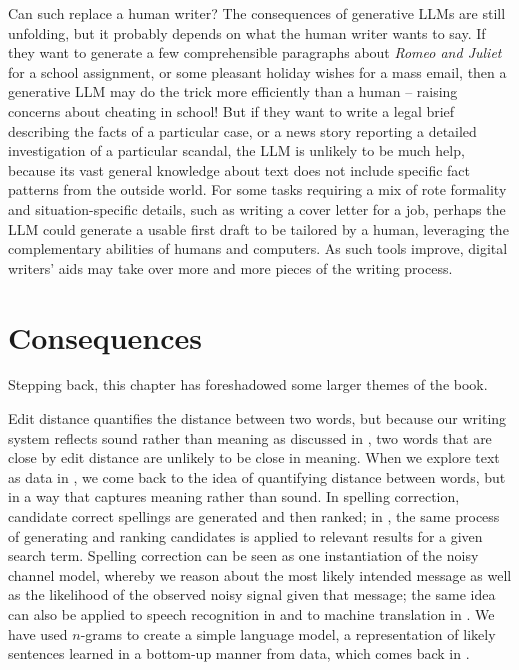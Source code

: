 Can such  replace a human writer?  The consequences of generative LLMs are still unfolding, but it probably depends on what the human writer wants to say.  If they want to generate a few comprehensible paragraphs about \textit{Romeo and Juliet} for a school assignment, or some pleasant holiday wishes for a mass email, then a generative LLM may do the trick 
more efficiently than a human -- raising concerns about cheating in school!  But if they want to write a legal brief describing the facts of a particular case, or a news story reporting a detailed investigation of a particular scandal, the LLM is unlikely to be much help, because its vast general knowledge about text does not include specific fact patterns from the outside world.  
For some tasks requiring a mix of rote formality and situation-specific details, such as writing a cover letter for a job, perhaps the LLM could generate a usable first draft to be tailored by a human, leveraging the complementary abilities of humans and computers.  As such tools improve, digital writers' aids may take over more and more pieces of the writing process.


\section{Consequences}

Stepping back, this chapter has foreshadowed some larger themes of the book.  

Edit distance quantifies the distance between two words, but because our writing system reflects sound rather than meaning as discussed in , two words that are close by edit distance are unlikely to be close in meaning.  When we explore text as data in , we come back to the idea of quantifying distance between words, but in a way that  captures meaning rather than sound.  In spelling correction, candidate correct spellings are generated and then ranked;  in ,  the same process of generating and ranking candidates is applied to relevant  results for a given search term.  Spelling correction can be seen as one instantiation of the noisy channel model, whereby we reason about the most likely intended message as well as the likelihood of the observed noisy signal given that message; the same idea  can also be applied to speech recognition in  and to machine translation in .  We have used $n$-grams to create a simple language model, a representation of likely sentences learned in a bottom-up manner from data, which comes back in . 

